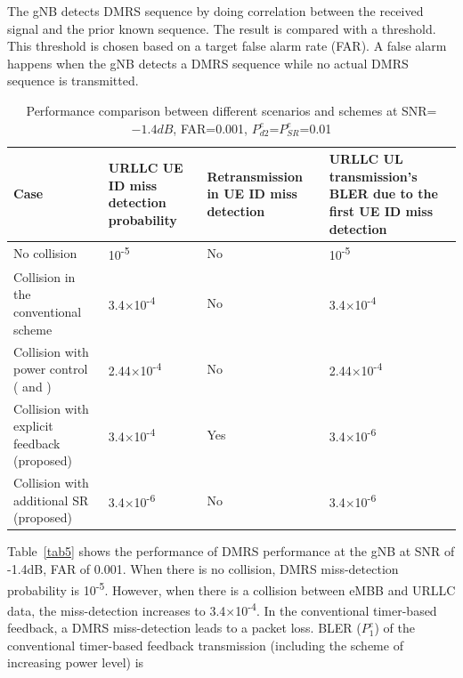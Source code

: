 \documentclass{ieeeaccess}
\begin{document}
The gNB detects DMRS sequence by doing correlation between the received signal and the prior known sequence. The result is compared with a threshold. This threshold is chosen based on a target false alarm rate (FAR). A false alarm happens when the gNB detects a DMRS sequence while no actual DMRS sequence is transmitted.

\begin{table}[htbp]
\caption{Performance comparison between different scenarios and schemes at SNR=$-1.4dB$, FAR=0.001, $P^{e}_{d2}$=$P^{e}_{SR}$=0.01}
\begin{center}
\begin{tabular}{|p{19em}|p{9em}|p{10em}|p{12em}|}
 \hline
 \textbf{Case} & \textbf{URLLC UE ID miss detection probability}& \textbf{Retransmission in UE ID miss detection}& \textbf{URLLC UL transmission's BLER due to the first UE ID miss detection}\\
 \hline
 No collision  & 10\textsuperscript{-5}&No&10\textsuperscript{-5}\\
 \hline
 Collision in the conventional scheme& 3.4$\times$10\textsuperscript{-4}&No&3.4$\times$10\textsuperscript{-4}\\
 \hline
 Collision with power control (\cite{ref13} and \cite {ref14})&2.44$\times$10\textsuperscript{-4}&No&2.44$\times$10\textsuperscript{-4}\\
 \hline
 Collision with explicit feedback (proposed)& 3.4$\times$10\textsuperscript{-4}&Yes&3.4$\times$10\textsuperscript{-6}\\
\hline
 Collision with additional SR (proposed)& 3.4$\times$10\textsuperscript{-6}&No&3.4$\times$10\textsuperscript{-6}\\

 
 \hline
\end{tabular}
\label{tab10}
\end{center}

\end{table}

Table~\ref{tab5} shows the performance of DMRS performance at the gNB at SNR of -1.4dB, FAR of 0.001. When there is no collision, DMRS miss-detection probability is 10\textsuperscript{-5}. However, when there is a collision between eMBB and URLLC data, the miss-detection increases to 3.4$\times$10\textsuperscript{-4}. In the conventional timer-based feedback, a DMRS miss-detection leads to a packet loss. BLER ($ P^{e}_{1}$) of the conventional timer-based feedback transmission (including the scheme of increasing power level) is 
\end{document}

